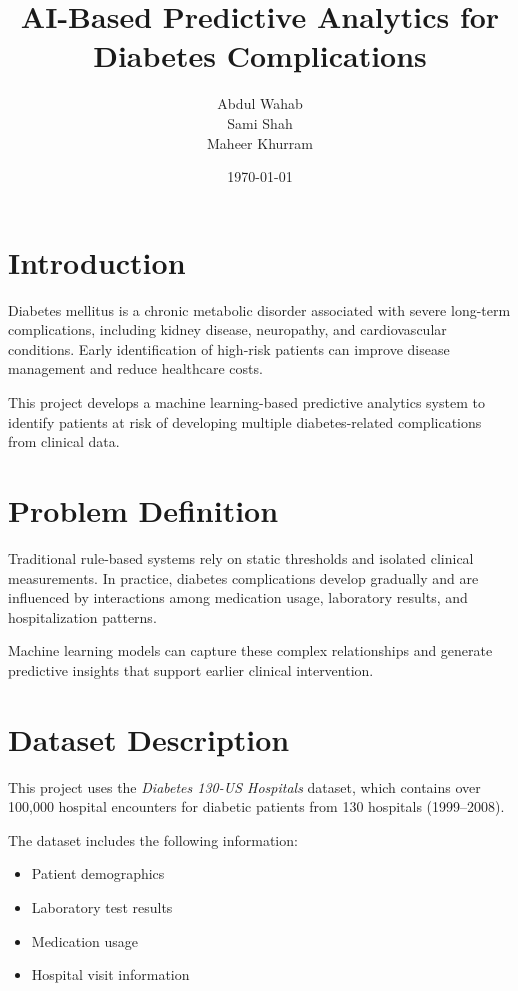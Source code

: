 \documentclass[12pt]{article}
\title{AI-Based Predictive Analytics for Diabetes Complications}
\author{
Abdul Wahab \\
Sami Shah \\
Maheer Khurram
}
\date{\today}
\begin{document}
\maketitle

\tableofcontents
\newpage


\section{Introduction}

Diabetes mellitus is a chronic metabolic disorder associated with severe long-term complications, including kidney disease, neuropathy, and cardiovascular conditions. Early identification of high-risk patients can improve disease management and reduce healthcare costs.

This project develops a machine learning-based predictive analytics system to identify patients at risk of developing multiple diabetes-related complications from clinical data.


\section{Problem Definition}

Traditional rule-based systems rely on static thresholds and isolated clinical measurements. In practice, diabetes complications develop gradually and are influenced by interactions among medication usage, laboratory results, and hospitalization patterns.

Machine learning models can capture these complex relationships and generate predictive insights that support earlier clinical intervention.


\section{Dataset Description}

This project uses the \textit{Diabetes 130-US Hospitals} dataset, which contains over 100,000 hospital encounters for diabetic patients from 130 hospitals (1999--2008).

The dataset includes the following information:

\begin{itemize}
\item Patient demographics
\item Laboratory test results
\item Medication usage
\item Hospital visit information
\end{itemize}
\end{document}
